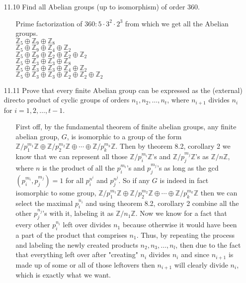 \documentclass[12pt]{article}
\begin{document}
\begin{enumerate}
\item[11.10] Find all Abelian groups (up to isomorphism) of order 360.
\begin{enumerate}
\item[] Prime factorization of $360: 5 \cdot 3^2 \cdot 2^3$ from which we get all the Abelian groups.\\
$\mathbb{Z}_5 \oplus \mathbb{Z}_9 \oplus \mathbb{Z}_8$ \\
$\mathbb{Z}_5 \oplus \mathbb{Z}_9 \oplus \mathbb{Z}_4 \oplus \mathbb{Z}_2$ \\
$\mathbb{Z}_5 \oplus \mathbb{Z}_9 \oplus \mathbb{Z}_2 \oplus \mathbb{Z}_2 \oplus \mathbb{Z}_2$ \\
$\mathbb{Z}_5 \oplus \mathbb{Z}_3 \oplus \mathbb{Z}_3 \oplus \mathbb{Z}_8$ \\
$\mathbb{Z}_5 \oplus \mathbb{Z}_3 \oplus \mathbb{Z}_3 \oplus \mathbb{Z}_4 \oplus \mathbb{Z}_2$ \\
$\mathbb{Z}_5 \oplus \mathbb{Z}_3 \oplus \mathbb{Z}_3 \oplus \mathbb{Z}_2 \oplus \mathbb{Z}_2 \oplus \mathbb{Z}_2$
\end{enumerate}

\item[11.11] Prove that every finite Abelian group can be expressed as the (external) directo product of
cyclic groups of orders $n_1, n_2, \ldots, n_t$, where $n_{i + 1}$ divides $n_i$ for $i = 1, 2, \ldots, t - 1$.
\begin{enumerate}
\item[] First off, by the fundamental theorem of finite abelian groups, any finite abelian group, $G$,
is isomorphic to a group of the form 
$\mathbb{Z}/p_1^{m_1}\mathbb{Z} \oplus \mathbb{Z}/p_2^{m_2}\mathbb{Z} \oplus \cdots \oplus 
\mathbb{Z}/p_k^{m_k}\mathbb{Z}$. Then by theorem 8.2, corollary 2 we know that we can 
represent all those $\mathbb{Z}/p_i^{m_i}\mathbb{Z}$'s and $\mathbb{Z}/p_j^{m_j}\mathbb{Z}$'s as
$\mathbb{Z}/n\mathbb{Z}$, where $n$ is the product of all the $p_i^{m_i}$'s and $p_j^{m_j}$'s as 
long as the gcd$(p_i^{m_i}, p_j^{m_j}) = 1$ for all $p_i^{n^i}$ and $p_j^{n^j}$. So if any $G$ is indeed
in fact isomorphic to some group, $\mathbb{Z}/p_1^{m_1}\mathbb{Z} \oplus \mathbb{Z}/p_2^{m_2}\mathbb{Z} 
\oplus \cdots \oplus \mathbb{Z}/p_k^{m_k}\mathbb{Z}$ then we can select the maximal $p_i^{n_i}$ and 
using theorem 8.2, corollary 2 combine all the other $p_j^{n_j}$'s with it, labeling it as 
$\mathbb{Z}/n_1\mathbb{Z}$. Now we know for a fact that every other $p_i^{n_i}$ left over divides $n_1$
because otherwise it would have been a part of the product that comprises $n_1$. Thus, by repeating the
process and labeling the newly created products $n_2, n_3, \ldots, n_l$, then due to the fact 
that everything left over after "creating" $n_i$ divides $n_i$ and since $n_{i + 1}$ is made up of 
some or all of those leftovers then $n_{i + 1}$ will clearly divide $n_i$, which is exactly
what we want.
\end{enumerate}


\end{enumerate}
\end{document}
